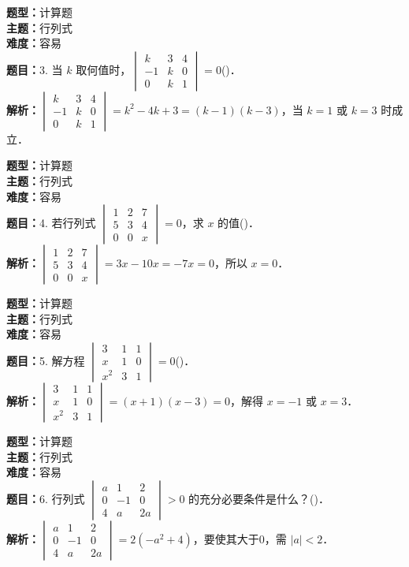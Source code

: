 \documentclass{ctexart}
\newenvironment{question}[5]{%
	\noindent\textbf{题型：}#1\\
	\textbf{主题：}#2\\
	\textbf{难度：}#3\\
	\textbf{题目：}#4\\
	\textbf{解析：}#5\\
	\vspace{1em}
}{}
\begin{document}
	\begin{question} 
		{计算题} 
		{行列式}
		{容易}
		{3. 当 \(k\) 取何值时，\(\begin{vmatrix} k & 3 & 4 \\ -1 & k & 0 \\ 0 & k & 1\end{vmatrix}=0\)(\qquad)．}
		{\(\begin{vmatrix} k & 3 & 4 \\ -1 & k & 0 \\ 0 & k & 1\end{vmatrix}=k^2-4k+3=(k-1)(k-3)\)，当 \(k=1\) 或 \(k=3\) 时成立．}
	\end{question}
	
	\begin{question} 
		{计算题} 
		{行列式}
		{容易}
		{4. 若行列式 \(\begin{vmatrix} 1 & 2 & 7 \\ 5 & 3 & 4 \\ 0 & 0 & x\end{vmatrix}=0\)，求 \(x\) 的值(\qquad)．}
		{\(\begin{vmatrix} 1 & 2 & 7 \\ 5 & 3 & 4 \\ 0 & 0 & x\end{vmatrix}=3x - 10x = -7x=0\)，所以 \(x=0\)．}
	\end{question}
	
	\begin{question} 
		{计算题} 
		{行列式}
		{容易}
		{5. 解方程 \(\begin{vmatrix} 3 & 1 & 1 \\ x & 1 & 0 \\ x^2 & 3 & 1\end{vmatrix}=0\)(\qquad)．}
		{\(\begin{vmatrix} 3 & 1 & 1 \\ x & 1 & 0 \\ x^2 & 3 & 1\end{vmatrix}=(x+1)(x-3)=0\)，解得 \(x=-1\) 或 \(x=3\)．}
	\end{question}
	
	\begin{question} 
		{计算题} 
		{行列式}
		{容易}
		{6. 行列式 \(\begin{vmatrix} a & 1 & 2 \\ 0 & -1 & 0 \\ 4 & a & 2a\end{vmatrix}>0\) 的充分必要条件是什么？(\qquad)．}
		{\(\begin{vmatrix} a & 1 & 2 \\ 0 & -1 & 0 \\ 4 & a & 2a\end{vmatrix}=2(-a^2+4)\)，要使其大于0，需 \(|a|<2\)．}
	\end{question}
	
\end{document}
